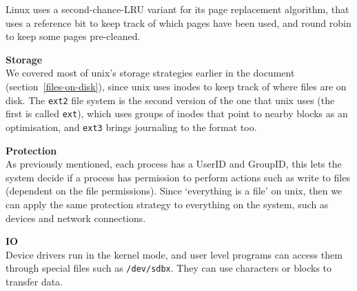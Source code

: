 \begin{description}
  Linux uses a second-chance-LRU variant for its page replacement algorithm,
  that uses a reference bit to keep track of which pages have been used, and
  round robin to keep some pages pre-cleaned.

  \item \textbf{Storage}\\
  We covered most of unix's storage strategies earlier in the document
  (section~\ref{files-on-disk}), since unix uses inodes to keep track of where
  files are on disk. The \texttt{ext2} file system is the second version of the
  one that unix uses (the first is called \texttt{ext}), which uses groups of
  inodes that point to nearby blocks as an optimisation, and \texttt{ext3}
  brings journaling to the format too.

  \item \textbf{Protection}\\
  As previously mentioned, each process has a UserID and GroupID, this lets the
  system decide if a process has permission to perform actions such as write to
  files (dependent on the file permissions). Since `everything is a file' on
  unix, then we can apply the same protection strategy to everything on the
  system, such as devices and network connections.

  \item \textbf{IO}\\
  Device drivers run in the kernel mode, and user level programs can access them
  through special files such as \texttt{/dev/sdbx}. They can use characters or
  blocks to transfer data.

\end{description}